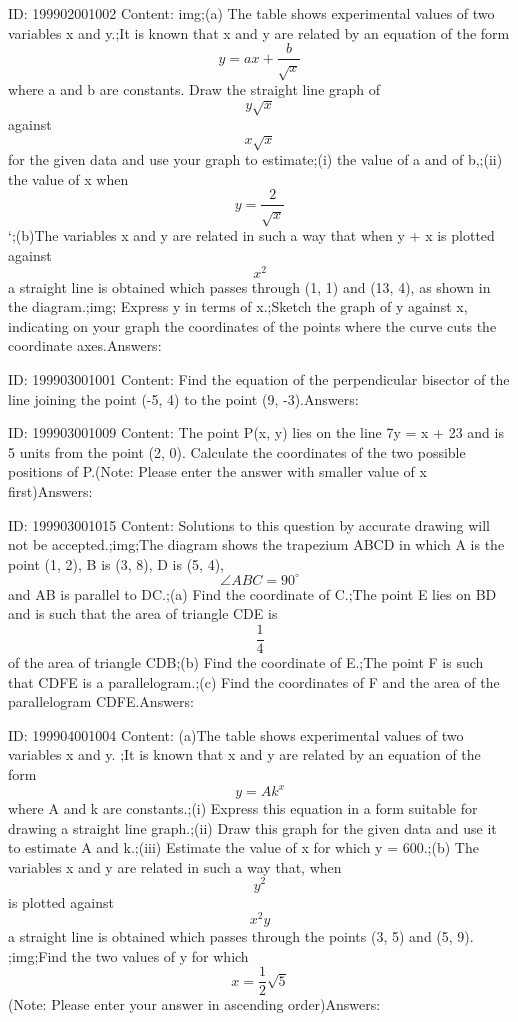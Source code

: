 \documentclass{article}
\begin{document}
ID: 199902001002
Content:
img;(a)	The table shows experimental values of two variables x and y.;It is known that x and y are related by an equation of the form \[y=ax+\frac{b}{\sqrt{x}}\] where a and b are constants. Draw the straight line graph of \[y\sqrt{x}\] against \[x\sqrt{x}\] for the given data and use your graph to estimate;(i)	the value of a and of b,;(ii)	the value of x when \[y=\frac{2}{\sqrt{x}}\] `;(b)The variables x and y are related in such a way that when y + x is plotted against \[x^2\] a straight line is obtained which passes through (1, 1) and (13, 4), as shown in the diagram.;img; Express y in terms of x.;Sketch the graph of y against x, indicating on your graph the coordinates of the points where the curve cuts the coordinate axes.Answers:

ID: 199903001001
Content:
Find the equation of the perpendicular bisector of the line joining the point (-5, 4) to the point (9, -3).Answers:

ID: 199903001009
Content:
The point P(x, y) lies on the line 7y = x + 23 and is 5 units from the point (2, 0). Calculate the coordinates of the two possible positions of P.(Note: Please enter the answer with smaller value of x first)Answers:

ID: 199903001015
Content:
Solutions to this question by accurate drawing will not be accepted.;img;The diagram shows the trapezium ABCD in which A is the point (1, 2), B is (3, 8), D is (5, 4), \[\angle ABC=90^{\circ}\] and AB is parallel to DC.;(a)	Find the coordinate of C.;The point E lies on BD and is such that the area of triangle CDE is \[\frac{1}{4}\] of the area of triangle CDB;(b)	Find the coordinate of E.;The point F is such that CDFE is a parallelogram.;(c) Find the coordinates of F and the area of the parallelogram CDFE.Answers:

ID: 199904001004
Content:
(a)The table shows experimental values of two variables x and y. ;It is known that x and y are related by an equation of the form \[y=Ak^x\] where A and k are constants.;(i)	Express this equation in a form suitable for drawing a straight line graph.;(ii)	Draw this graph for the given data and use it to estimate A and k.;(iii) Estimate the value of x for which y = 600.;(b)	The variables x and y are related in such a way that, when \[y^2\] is plotted against \[x^2y\] a straight line is obtained which passes through the points (3, 5) and (5, 9). ;img;Find the two values of y for which \[x=\frac{1}{2}\sqrt5\] (Note: Please enter your answer in ascending order)Answers:
\end{document}

